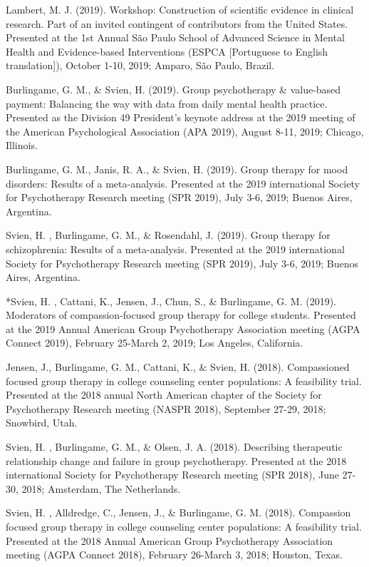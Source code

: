 \documentclass[
]{article}
\begin{document}
Lambert, M. J. (2019). Workshop: Construction of scientific evidence in clinical research. Part of an invited contingent of contributors from the United States. Presented at the 1st Annual São Paulo School of Advanced Science in Mental Health and Evidence-based Interventions (ESPCA {[}Portuguese to English translation{]}), October 1-10, 2019; Amparo, São Paulo, Brazil.

Burlingame, G. M., \& Svien, H. (2019). Group psychotherapy \& value-based payment: Balancing the way with data from daily mental health practice. Presented as the Division 49 President's keynote address at the 2019 meeting of the American Psychological Association (APA 2019), August 8-11, 2019; Chicago, Illinois.

Burlingame, G. M., Janis, R. A., \& Svien, H. (2019). Group therapy for mood disorders: Results of a meta-analysis. Presented at the 2019 international Society for Psychotherapy Research meeting (SPR 2019), July 3-6, 2019; Buenos Aires, Argentina.

Svien, H. , Burlingame, G. M., \& Rosendahl, J. (2019). Group therapy for schizophrenia: Results of a meta-analysis. Presented at the 2019 international Society for Psychotherapy Research meeting (SPR 2019), July 3-6, 2019; Buenos Aires, Argentina.

*Svien, H. , Cattani, K., Jensen, J., Chun, S., \& Burlingame, G. M. (2019). Moderators of compassion-focused group therapy for college students. Presented at the 2019 Annual American Group Psychotherapy Association meeting (AGPA Connect 2019), February 25-March 2, 2019; Los Angeles, California.

Jensen, J., Burlingame, G. M., Cattani, K., \& Svien, H. (2018). Compassioned focused group therapy in college counseling center populations: A feasibility trial. Presented at the 2018 annual North American chapter of the Society for Psychotherapy Research meeting (NASPR 2018), September 27-29, 2018; Snowbird, Utah.

Svien, H. , Burlingame, G. M., \& Olsen, J. A. (2018). Describing therapeutic relationship change and failure in group psychotherapy. Presented at the 2018 international Society for Psychotherapy Research meeting (SPR 2018), June 27-30, 2018; Amsterdam, The Netherlands.

Svien, H. , Alldredge, C., Jensen, J., \& Burlingame, G. M. (2018). Compassion focused group therapy in college counseling center populations: A feasibility trial. Presented at the 2018 Annual American Group Psychotherapy Association meeting (AGPA Connect 2018), February 26-March 3, 2018; Houston, Texas.
\end{document}
